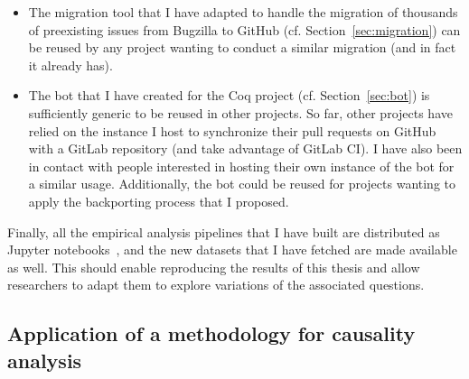 \begin{itemize}
	\item The migration tool that I have adapted to handle the migration of thousands of preexisting issues from Bugzilla to GitHub (cf. Section~\ref{sec:migration}) can be reused by any project wanting to conduct a similar migration (and in fact it already has).
	\item The bot that I have created for the Coq project (cf. Section~\ref{sec:bot}) is sufficiently generic to be reused in other projects. So far, other projects have relied on the instance I host to synchronize their pull requests on GitHub with a GitLab repository (and take advantage of GitLab CI). I have also been in contact with people interested in hosting their own instance of the bot for a similar usage. Additionally, the bot could be reused for projects wanting to apply the backporting process that I proposed.
\end{itemize}

Finally, all the empirical analysis pipelines that I have built are distributed as Jupyter notebooks~\cite{zimmermann2019bugtracker,zimmermann2019ci,zimmermann2019community,zimmermann2019contributors,zimmermann2019librariesio,zimmermann2019templates}, and the new datasets that I have fetched are made available as well.
This should enable reproducing the results of this thesis and allow researchers to adapt them to explore variations of the associated questions.

\subsection{Application of a methodology for causality analysis}

